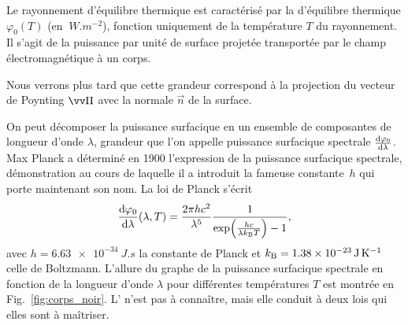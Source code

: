 \documentclass[12pt,fancy]{cours}
\begin{document}
 Le rayonnement d'équilibre thermique est caractérisé par la  d'équilibre thermique $\varphi_0(T)$ (en $\SI{}{W.m^{-2}}$), fonction uniquement de la température $T$ du rayonnement. Il s'agit de la puissance par unité de surface projetée transportée par le champ électromagnétique à un corps.
\begin{remarque}
  Nous verrons plus tard que cette grandeur correspond à la projection du vecteur de Poynting $\Poy$ avec la normale  $\Vec{n}$ de la surface.
\end{remarque}
On peut décomposer la puissance surfacique en un ensemble de composantes de longueur d'onde $\lambda$, grandeur que l'on appelle puissance surfacique spectrale $\frac{\mathrm{d}{\varphi_0}}{\mathrm{d}{\lambda}}$. Max Planck a déterminé en 1900 l'expression de la puissance surfacique spectrale, démonstration au cours de laquelle il a introduit la fameuse constante~$h$ qui porte maintenant son nom. La loi de Planck s'écrit
\begin{equation}\label{eq:planck}
\begin{split}
\frac{\mathrm{d}{\varphi_0}}{\mathrm{d}{\lambda}}(\lambda,T)=\dfrac{2\pi hc^2}{\lambda^{5}}\dfrac{1}{\exp\!\left(\frac{h c}{\lambda k_{\rm{B}}T}\right)-1},
\end{split}
\end{equation}
avec $h=\SI{6,63e-34}{J.s}$ la constante de Planck et $k_{\rm{B}}=\SI{1,38e-23}{J.K^{-1}}$ celle de Boltzmann. L'allure du graphe de la puissance surfacique spectrale en fonction de la longueur d'onde $\lambda$ pour différentes températures $T$ est montrée en Fig.~\ref{fig:corps_noir}. L' n'est pas à connaître, mais elle conduit à deux lois qui elles sont à maîtriser.
%
\end{document}
